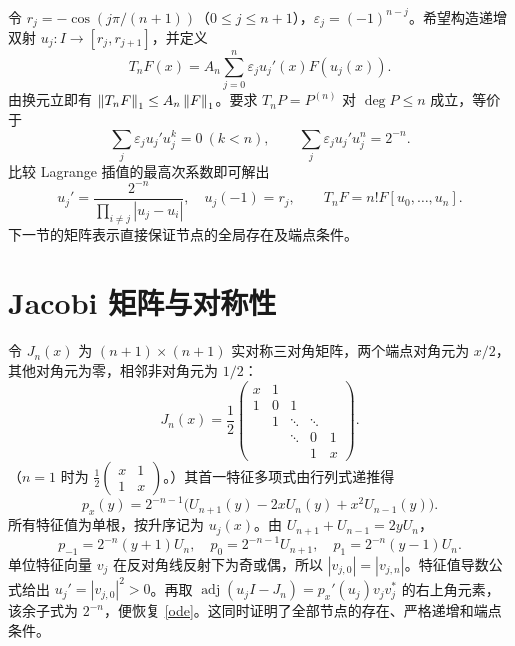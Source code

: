 \documentclass[11pt,a4paper,fontset=fandol]{ctexart}
\begin{document}
令 $r_j=-\cos(j\pi/(n+1))$（$0\le j\le n+1$），$\varepsilon_j=(-1)^{n-j}$。希望构造递增双射 $u_j:I\to[r_j,r_{j+1}]$，并定义
\begin{equation}\label{T}
 T_nF(x)=A_n\sum_{j=0}^n\varepsilon_j u_j'(x)F(u_j(x)).
\end{equation}
由换元立即有 $\left\|T_nF\right\|_1\le A_n\left\|F\right\|_1$。要求 $T_nP=P^{(n)}$ 对 $\deg P\le n$ 成立，等价于
\[
 \sum_j\varepsilon_j u_j'u_j^k=0\ (k<n),\qquad \sum_j\varepsilon_j u_j'u_j^n=2^{-n}.
\]
比较 Lagrange 插值的最高次系数即可解出
\begin{equation}\label{ode}
 u_j'=\frac{2^{-n}}{\prod_{i\ne j}|u_j-u_i|},\quad u_j(-1)=r_j,\qquad T_nF=n!F[u_0,\ldots,u_n].
\end{equation}
下一节的矩阵表示直接保证节点的全局存在及端点条件。

\section{Jacobi 矩阵与对称性}\label{sec:matrix}
令 $J_n(x)$ 为 $(n+1)\times(n+1)$ 实对称三对角矩阵，两个端点对角元为 $x/2$，其他对角元为零，相邻非对角元为 $1/2$：
\begin{equation}\label{J}
 J_n(x)=\frac12\begin{pmatrix}x&1&&&\\1&0&1&&\\&1&\ddots&\ddots&\\&&\ddots&0&1\\&&&1&x\end{pmatrix}.
\end{equation}
（$n=1$ 时为 $\frac12\left(\begin{smallmatrix}x&1\\1&x\end{smallmatrix}\right)$。）其首一特征多项式由行列式递推得
\begin{equation}\label{char}
 p_x(y)=2^{-n-1}\bigl(U_{n+1}(y)-2xU_n(y)+x^2U_{n-1}(y)\bigr).
\end{equation}
所有特征值为单根，按升序记为 $u_j(x)$。由 $U_{n+1}+U_{n-1}=2yU_n$，
\[
 p_{-1}=2^{-n}(y+1)U_n,\quad p_0=2^{-n-1}U_{n+1},\quad p_1=2^{-n}(y-1)U_n.
\]
单位特征向量 $v_j$ 在反对角线反射下为奇或偶，所以 $|v_{j,0}|=|v_{j,n}|$。特征值导数公式给出 $u_j'=|v_{j,0}|^2>0$。再取
$\operatorname{adj}(u_jI-J_n)=p_x'(u_j)v_jv_j^*$ 的右上角元素，该余子式为 $2^{-n}$，便恢复 \eqref{ode}。这同时证明了全部节点的存在、严格递增和端点条件。
\end{document}
